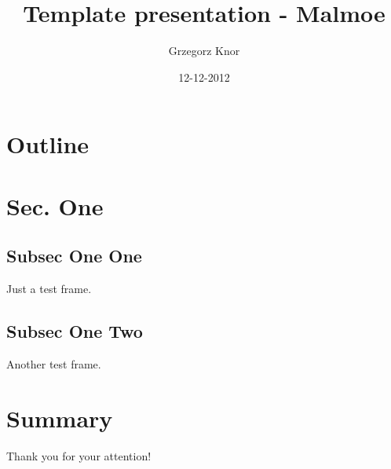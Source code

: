 \documentclass{beamer}
\title{Template presentation - Malmoe}
\author{Grzegorz Knor}
\date{12-12-2012}
\begin{document}
\begin{frame}
\titlepage
\end{frame}
\section*{Outline}
\begin{frame}
\tableofcontents
\end{frame}
\section{Sec. One}
\subsection{Subsec One One}
\begin{frame}
Just a test frame.
\end{frame}
\subsection{Subsec One Two}
\begin{frame}
Another test frame.
\end{frame}
\section{Summary}
\begin{frame}
Thank you for your attention!
\end{frame}
\end{document}
